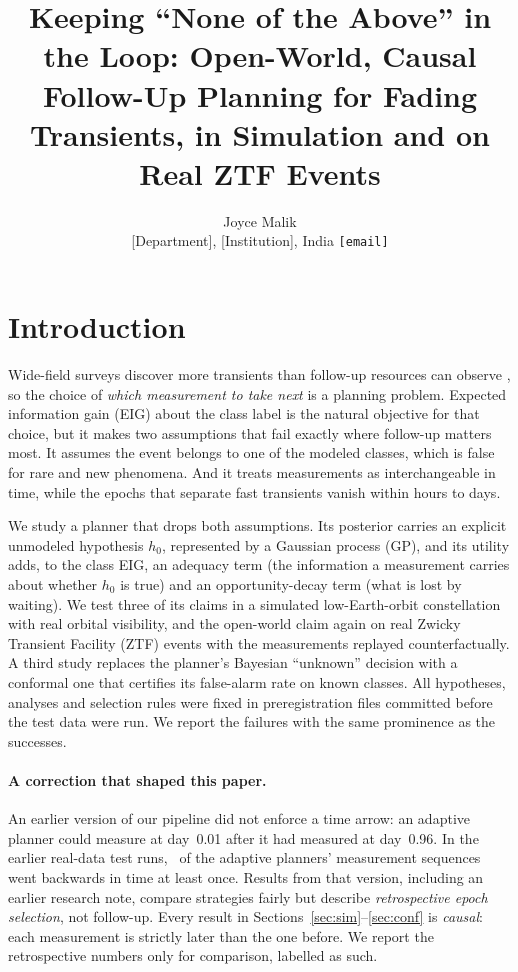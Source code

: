 \documentclass[10pt,twocolumn]{article}
\title{Keeping ``None of the Above'' in the Loop: Open-World, Causal Follow-Up Planning for Fading Transients, in Simulation and on Real ZTF Events}
\author{Joyce Malik\\ \small [Department], [Institution], India \quad \texttt{[email]}}
\date{}
\begin{document}
\maketitle



\section{Introduction}
Wide-field surveys discover more transients than follow-up resources can observe \citep{Bellm2019,Ivezic2019}, so the choice of \emph{which measurement to take next} is a planning problem. Expected information gain (EIG) about the class label \citep{Lindley1956,Chaloner1995} is the natural objective for that choice, but it makes two assumptions that fail exactly where follow-up matters most. It assumes the event belongs to one of the modeled classes, which is false for rare and new phenomena. And it treats measurements as interchangeable in time, while the epochs that separate fast transients vanish within hours to days.

We study a planner that drops both assumptions. Its posterior carries an explicit unmodeled hypothesis $h_0$, represented by a Gaussian process (GP), and its utility adds, to the class EIG, an adequacy term (the information a measurement carries about whether $h_0$ is true) and an opportunity-decay term (what is lost by waiting). We test three of its claims in a simulated low-Earth-orbit constellation with real orbital visibility, and the open-world claim again on real Zwicky Transient Facility (ZTF) events with the measurements replayed counterfactually. A third study replaces the planner's Bayesian ``unknown'' decision with a conformal one that certifies its false-alarm rate on known classes. All hypotheses, analyses and selection rules were fixed in preregistration files committed before the test data were run. We report the failures with the same prominence as the successes.

\paragraph{A correction that shaped this paper.} An earlier version of our pipeline did not enforce a time arrow: an adaptive planner could measure at day~0.01 after it had measured at day~0.96. In the earlier real-data test runs, \CausalBugPct\ of the adaptive planners' measurement sequences went backwards in time at least once. Results from that version, including an earlier research note, compare strategies fairly but describe \emph{retrospective epoch selection}, not follow-up. Every result in Sections~\ref{sec:sim}--\ref{sec:conf} is \emph{causal}: each measurement is strictly later than the one before. We report the retrospective numbers only for comparison, labelled as such.
\end{document}
